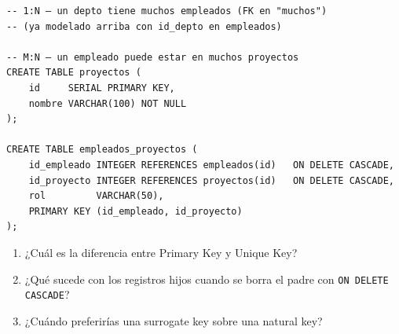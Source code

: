 \begin{lstlisting}[caption={Cardinalidades 1:1, 1:N, M:N}]
-- 1:N — un depto tiene muchos empleados (FK en "muchos")
-- (ya modelado arriba con id_depto en empleados)

-- M:N — un empleado puede estar en muchos proyectos
CREATE TABLE proyectos (
    id     SERIAL PRIMARY KEY,
    nombre VARCHAR(100) NOT NULL
);

CREATE TABLE empleados_proyectos (
    id_empleado INTEGER REFERENCES empleados(id)   ON DELETE CASCADE,
    id_proyecto INTEGER REFERENCES proyectos(id)   ON DELETE CASCADE,
    rol         VARCHAR(50),
    PRIMARY KEY (id_empleado, id_proyecto)
);
\end{lstlisting}

\begin{entrevistabox}
\begin{enumerate}
  \item ¿Cuál es la diferencia entre Primary Key y Unique Key?
  \item ¿Qué sucede con los registros hijos cuando se borra el padre con \texttt{ON DELETE CASCADE}?
  \item ¿Cuándo preferirías una surrogate key sobre una natural key?
\end{enumerate}
\end{entrevistabox}
